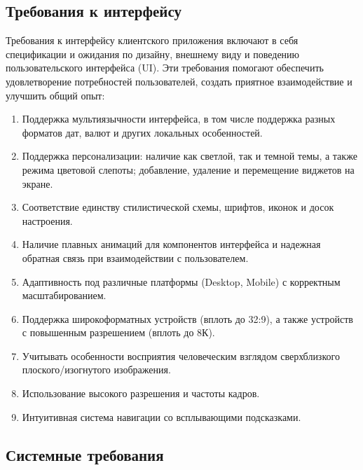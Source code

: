 \documentclass[a4paper,14pt]{extarticle}
\begin{document}
\begin{spacing}{1.5}
\subsection{Требования к интерфейсу}
\hspace{\parindent} Требования к интерфейсу клиентского приложения включают в себя спецификации и ожидания по дизайну, внешнему виду и поведению пользовательского интерфейса (UI). Эти требования помогают обеспечить удовлетворение потребностей пользователей, создать приятное взаимодействие и улучшить общий опыт: 
\begin{enumerate}[label*=\arabic*.]
        \item Поддержка мультиязычности интерфейса, в том числе поддержка разных форматов дат, валют и других локальных особенностей.
        \item Поддержка персонализации: наличие как светлой, так и темной темы, а также режима цветовой слепоты; добавление, удаление и перемещение виджетов на экране.
        \item Соответствие единству стилистической схемы, шрифтов, иконок и досок настроения.
        \item Наличие плавных анимаций для компонентов интерфейса и надежная обратная связь при взаимодействии с пользователем.
        \item {\color{BrickRed}Адаптивность под различные платформы (Desktop, Mobile) с корректным масштабированием.}
        \item {\color{BrickRed}Поддержка широкоформатных устройств (вплоть до 32:9), а также устройств с повышенным разрешением (вплоть до 8К).}
        \item {\color{RoyalBlue} Учитывать особенности восприятия человеческим взглядом сверхблизкого плоского/изогнутого изображения.}
        \item {\color{RoyalBlue} Использование высокого разрешения и частоты кадров.}
        \item Интуитивная система навигации со всплывающими подсказками.
\end{enumerate}


\subsection{Системные требования}


\end{spacing}
\end{document}
